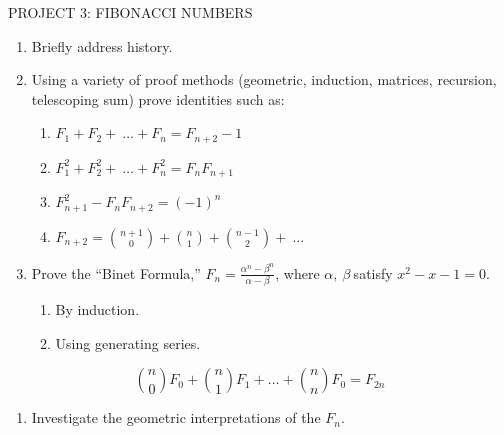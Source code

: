 PROJECT 3: FIBONACCI NUMBERS
\begin{enumerate}
\def\labelenumi{\arabic{enumi}.}

\item
  Briefly address history.
\item
  Using a variety of proof methods (geometric, induction, matrices,
  recursion, telescoping sum) prove identities such as:
\begin{enumerate}
  \def\labelenumii{\alph{enumii}.}

  \item
    \(F_{1} + F_{2} + \ \ldots + F_{n} = F_{n + 2} - 1\)
  \item
    \(F_{1}^{2} + F_{2}^{2} + \ \ldots + F_{n}^{2} = F_{n}F_{n + 1}\)
  \item
    \(F_{n + 1}^{2} - F_{n}F_{n + 2} = \left( - 1 \right)^{n}\)
  \item
    \(F_{n + 2} =
\binom{n + 1}{0}
 +
\binom{n}{1}
 +
\binom{n - 1}{2}
 + \ \ldots\)

\end{enumerate}
\item
  Prove the ``Binet Formula,''
  \(F_{n} = \frac{\alpha^{n} - \beta^{n}}{\alpha - \beta}\), where
  \(\alpha,\ \beta\ \)satisfy \(x^{2} - x - 1 = 0\).
\begin{enumerate}
  \def\labelenumii{\alph{enumii}.}

  \item
    By induction.
  \item
    Using generating series.

\end{enumerate}

\end{enumerate}

\[
\binom{n}{0}F_{0} + \binom{n}{1} F_{1} + \ldots + \binom{n}{n}F_{0} = F_{2n}
\]
\begin{enumerate}
\def\labelenumi{\arabic{enumi}.}

\item
  Investigate the geometric interpretations of the \(F_{n}\).

\end{enumerate}

